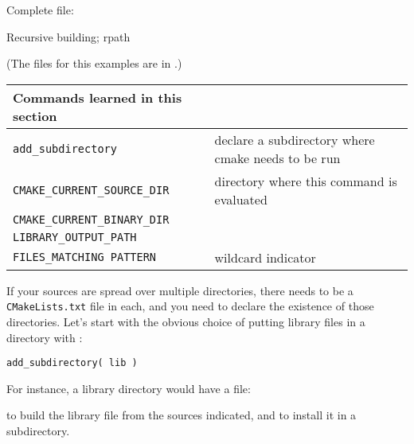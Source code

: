 Complete  file:
%


\newpage
{} {Recursive building; rpath}
\label{sec:cmake-install-dirs}
\label{sec:cmake-rpath}

(The files for this examples are in .)

\begin{tabular}{lp{3in}}
  \toprule
  Commands learned in this section\\
  \midrule
  \lstinline+add_subdirectory+&declare a subdirectory where cmake needs to be run\\
  \lstinline+CMAKE_CURRENT_SOURCE_DIR+&directory where this command is evaluated\\
  \lstinline+CMAKE_CURRENT_BINARY_DIR+&\\
  \lstinline+LIBRARY_OUTPUT_PATH+&\\
  \lstinline+FILES_MATCHING PATTERN+&wildcard indicator\\
  \bottomrule
\end{tabular}

\begin{floatingfigure}[r]{2.5in}
  \begin{minipage}{2.5in}
  \end{minipage}
\end{floatingfigure}
%
If your sources are spread over multiple directories,
there needs to be a \texttt{CMakeLists.txt} file in each,
and you need to declare the existence of those directories.
Let's start with the obvious choice of putting library files in a  directory
with :
\begin{lstlisting}
add_subdirectory( lib )
\end{lstlisting}
For instance, a library directory would have a  file:
%

%
to build the library file from the sources indicated,
and to install it in a  subdirectory.

